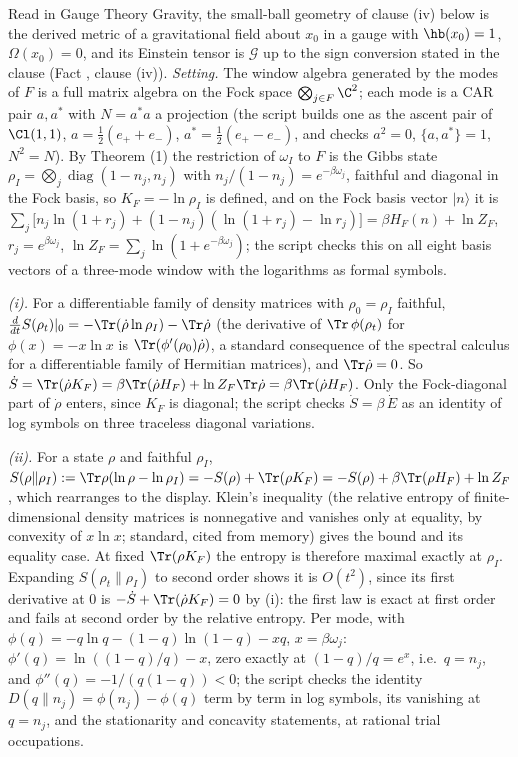 Read in Gauge Theory Gravity, the small-ball geometry of clause (iv) below is the derived metric of a gravitational field about $x_0$ in a gauge with $\hb(x_0) = 1$, $\Omega(x_0) = 0$, and its Einstein tensor is $\mathcal{G}$ up to the sign conversion stated in the clause (Fact , clause (iv)). \emph{Setting.} The window algebra generated by the modes of $F$ is a full matrix algebra on the Fock space $\bigotimes_{j \in F}\C^{2}$; each mode is a CAR pair $a, a^{*}$ with $N = a^{*}a$ a projection (the script builds one as the ascent pair of $\Cl(1,1)$, $a = \tfrac12(e_{+} + e_{-})$, $a^{*} = \tfrac12(e_{+} - e_{-})$, and checks $a^{2} = 0$, $\{a, a^{*}\} = 1$, $N^{2} = N$). By Theorem (1) the restriction of $\omega_{I}$ to $F$ is the Gibbs state $\rho_{I} = \bigotimes_{j}\operatorname{diag}(1 - n_{j}, n_{j})$ with $n_{j}/(1 - n_{j}) = e^{-\beta\omega_{j}}$, faithful and diagonal in the Fock basis, so $K_{F} = -\ln\rho_{I}$ is defined, and on the Fock basis vector $|n\rangle$ it is $\sum_{j}\bigl[n_{j}\ln(1 + r_{j}) + (1 - n_{j})(\ln(1 + r_{j}) - \ln r_{j})\bigr] = \beta H_{F}(n) + \ln Z_{F}$, $r_{j} = e^{\beta\omega_{j}}$, $\ln Z_{F} = \sum_{j}\ln(1 + e^{-\beta\omega_{j}})$; the script checks this on all eight basis vectors of a three-mode window with the logarithms as formal symbols.

\emph{(i).} For a differentiable family of density matrices with $\rho_{0} = \rho_{I}$ faithful, $\frac{d}{dt}S(\rho_{t})|_{0} = -\Tr(\dot\rho\ln\rho_{I}) - \Tr\dot\rho$ (the derivative of $\Tr\,\phi(\rho_{t})$ for $\phi(x) = -x\ln x$ is $\Tr(\phi'(\rho_{0})\dot\rho)$, a standard consequence of the spectral calculus for a differentiable family of Hermitian matrices), and $\Tr\dot\rho = 0$. So $\dot S = \Tr(\dot\rho K_{F}) = \beta\Tr(\dot\rho H_{F}) + \ln Z_{F}\Tr\dot\rho = \beta\Tr(\dot\rho H_{F})$. Only the Fock-diagonal part of $\dot\rho$ enters, since $K_{F}$ is diagonal; the script checks $\dot S = \beta\,\dot E$ as an identity of log symbols on three traceless diagonal variations.

\emph{(ii).} For a state $\rho$ and faithful $\rho_{I}$, $S(\rho\|\rho_{I}) := \Tr\rho(\ln\rho - \ln\rho_{I}) = -S(\rho) + \Tr(\rho K_{F}) = -S(\rho) + \beta\Tr(\rho H_{F}) + \ln Z_{F}$, which rearranges to the display. Klein's inequality (the relative entropy of finite-dimensional density matrices is nonnegative and vanishes only at equality, by convexity of $x\ln x$; standard, cited from memory) gives the bound and its equality case. At fixed $\Tr(\rho K_{F})$ the entropy is therefore maximal exactly at $\rho_{I}$. Expanding $S(\rho_{t}\|\rho_{I})$ to second order shows it is $O(t^{2})$, since its first derivative at $0$ is $-\dot S + \Tr(\dot\rho K_{F}) = 0$ by (i): the first law is exact at first order and fails at second order by the relative entropy. Per mode, with $\phi(q) = -q\ln q - (1 - q)\ln(1 - q) - xq$, $x = \beta\omega_{j}$: $\phi'(q) = \ln((1 - q)/q) - x$, zero exactly at $(1 - q)/q = e^{x}$, i.e.\ $q = n_{j}$, and $\phi''(q) = -1/(q(1 - q)) < 0$; the script checks the identity $D(q\|n_{j}) = \phi(n_{j}) - \phi(q)$ term by term in log symbols, its vanishing at $q = n_{j}$, and the stationarity and concavity statements, at rational trial occupations.

